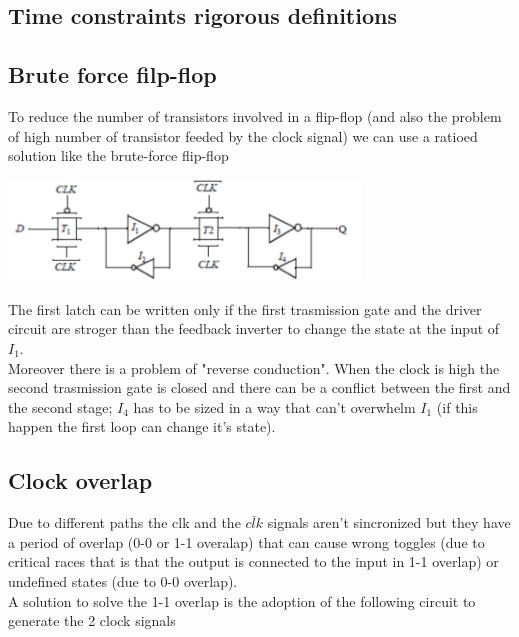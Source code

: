 \subsection{Time constraints rigorous definitions}





\subsection{Brute force filp-flop}

To reduce the number of transistors involved in a flip-flop (and also the problem of high number of transistor feeded by the clock signal) we can use a ratioed solution like the brute-force flip-flop

\centering
\includegraphics[width=0.7\textwidth]{C10_12.png}\\
\raggedright

The first latch can be written only if the first trasmission gate and the driver circuit are stroger than the feedback inverter to change the state at the input of $I_1$.\\
Moreover there is a problem of "reverse conduction". When the clock is high the second trasmission gate is closed and there can be a conflict between the first and the second stage; $I_4$ has to be sized in a way that can't overwhelm $I_1$ (if this happen the first loop can change it's state).\\

\subsection{Clock overlap}

Due to different paths the clk and the $\bar{clk}$ signals aren't sincronized but they have a period of overlap (0-0 or 1-1 overalap) that can cause wrong toggles (due to critical races that is that the output is connected to the input in 1-1 overlap) or undefined states (due to 0-0 overlap).\\
\vspace{5mm}
A solution to solve the 1-1 overlap is the adoption of the following circuit to generate the 2 clock signals

